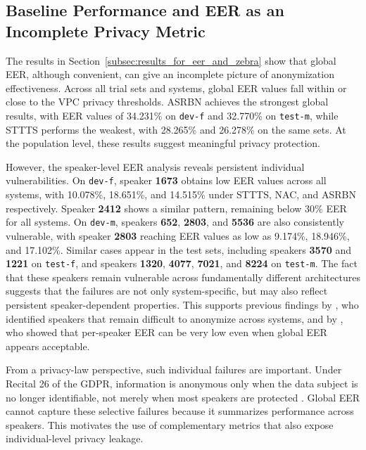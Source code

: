 \documentclass[12pt,leqno,a4paper]{article}
\begin{document}
\subsection{Baseline Performance and EER as an Incomplete Privacy Metric}
\label{subsubsec:baseline_performance_and_eer}
The results in Section~\ref{subsec:results_for_eer_and_zebra} show that global EER, although convenient, can give an incomplete picture of 
anonymization effectiveness. Across all trial sets and systems, global EER values fall within or close to the VPC privacy thresholds. 
ASRBN achieves the strongest global results, with EER values of 34.231\% on \texttt{dev-f} and 32.770\% on \texttt{test-m}, while STTTS performs the
weakest, with 28.265\% and 26.278\% on the same sets. At the population level, these results suggest meaningful privacy protection.

However, the speaker-level EER analysis reveals persistent individual vulnerabilities. On \texttt{dev-f}, speaker \textbf{1673} obtains low EER 
values across all systems, with 10.078\%, 18.651\%, and 14.515\% under STTTS, NAC, and ASRBN respectively. Speaker \textbf{2412} shows a similar 
pattern, remaining below 30\% EER for all systems. On \texttt{dev-m}, speakers \textbf{652}, \textbf{2803}, and \textbf{5536} are also consistently 
vulnerable, with speaker \textbf{2803} reaching EER values as low as 9.174\%, 18.946\%, and 17.102\%. Similar cases appear in the test sets, 
including speakers \textbf{3570} and \textbf{1221} on \texttt{test-f}, and speakers \textbf{1320}, \textbf{4077}, \textbf{7021}, and \textbf{8224} on 
\texttt{test-m}. The fact that these speakers remain vulnerable across fundamentally different architectures suggests that the failures are not only system-specific, 
but may also reflect persistent speaker-dependent properties. This supports previous findings by \cite{williams_anonymizing_2024}, who identified 
speakers that remain difficult to anonymize across systems, and by \cite{gaznepoglu2025sayexploitinglinguisticcontent}, who showed that per-speaker 
EER can be very low even when global EER appears acceptable.

From a privacy-law perspective, such individual failures are important. Under Recital 26 of the GDPR, information is anonymous only when the data 
subject is no longer identifiable, not merely when most speakers are protected \citep{noauthor_recital_nodate}. Global EER cannot capture these 
selective failures because it summarizes performance across speakers. This motivates the use of complementary metrics that also expose individual-level 
privacy leakage.
\end{document}
